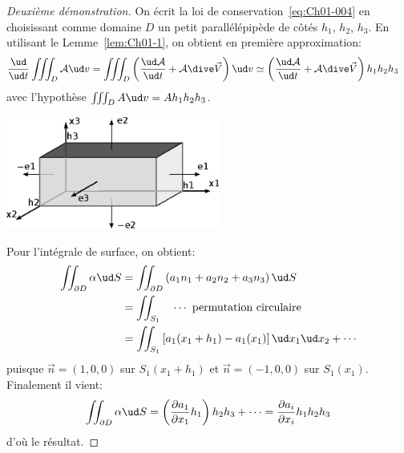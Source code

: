 \begin{proof}[Deuxième démonstration]
    On écrit la loi de conservation~\eqref{eq:Ch01-004} en choisissant comme domaine $D$ un petit parallélépipède de côtés $h_1$, $h_2$, $h_3$.
    En utilisant le Lemme~\ref{lem:Ch01-1}, on obtient en première approximation:
    \begin{align*}
        \frac{\ud}{\ud t}\iiint_D \mathcal{A} \ud v &= \iiint_D\left(\frac{\ud \mathcal{A}}{\ud t}+\mathcal{A}\dive \vec{V}\right)\ud v  \simeq \left(\frac{\ud \mathcal{A}}{\ud t}+\mathcal{A}\dive \vec{V}\right) h_1h_2h_3
    \end{align*}
    avec l'hypothèse $\iiint_D A \ud v =A h_1h_2h_3$.

\begin{center}
\includegraphics[width=7cm]{../images/T1_Ch01-0005.eps}
\end{center}

    Pour l'intégrale de surface, on obtient:
    \begin{align*}
        \iint_{\partial D}\alpha \ud S & =\iint_{\partial D}\left(a_1n_1+a_2n_2+a_3n_3\right)\ud S \\
                                       & =\iint_{S_1}\quad \cdots \text{ permutation circulaire}\\
                                       & =\iint_{S_1} \left[a_1(x_1+h_1)-a_1(x_1)\right] \ud x_1 \ud x_2 + \cdots
    \end{align*}
    puisque $\vec{n}= (1,0,0)$ sur $S_1(x_1+h_1)$ et $\vec{n} = (-1,0,0)$ sur $S_1(x_1)$.
    Finalement il vient:
    \begin{equation*}
        \iint_{\partial D}\alpha \ud S=\left(\frac{\partial a_1}{\partial x_1}h_1\right)h_2h_3+\cdots=\frac{\partial a_i}{\partial x_i}h_1 h_2 h_3
    \end{equation*}
    d'où le résultat.
\end{proof}

